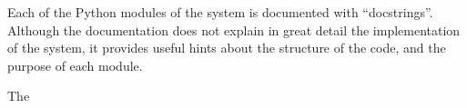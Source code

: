 
Each of the Python modules of the system is documented with
``docstrings''.
Although the documentation does not explain in great detail
the implementation of the system, it provides useful hints
about the structure of the code, and the purpose of each
module.

The 
